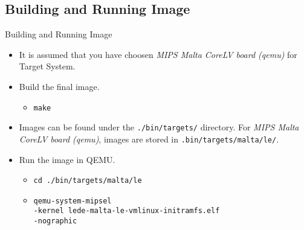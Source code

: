 \subsection{Building and Running Image}
\begin{frame}{Building and Running Image}
    \begin{itemize}[<+(1)->]
        \item It is assumed that you have choosen \textit{MIPS Malta CoreLV board (qemu)} for Target System.
        \item Build the final image.
        \begin{itemize}
            \item \texttt{make}
        \end{itemize}
        \item Images can be found under the \texttt{./bin/targets/} directory. For \textit{MIPS Malta CoreLV board (qemu)}, images are stored in \texttt{.bin/targets/malta/le/}.
        \item Run the image in QEMU.
        \begin{itemize}
            \item \texttt{cd ./bin/targets/malta/le}
            \item \texttt{qemu-system-mipsel} \\
                  \texttt{-kernel lede-malta-le-vmlinux-initramfs.elf} \\
                  \texttt{-nographic}
        \end{itemize}
    \end{itemize}
\end{frame}